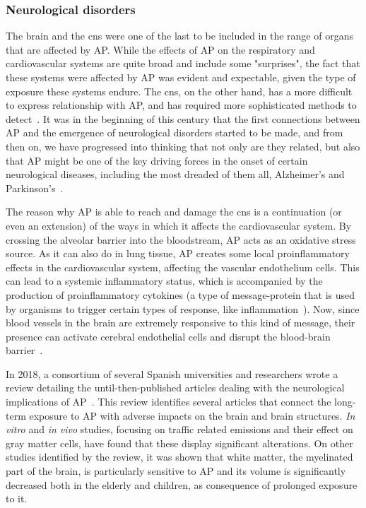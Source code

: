 \subsubsection{Neurological disorders}%
\label{ssub:neurological_disorders}

The brain and the \gls{cns} were one of the last to be included in the
range of organs that are affected by \gls{AP}. While the effects of
\gls{AP} on the respiratory and cardiovascular systems are quite broad
and include some "surprises", the fact that these systems were affected
by \acrlong{AP} was evident and expectable, given the type of exposure
these systems endure. The \gls{cns}, on the other hand, has a more
difficult to express relationship with \gls{AP}, and has required more
sophisticated methods to detect~\cite{Vallero2014, Genc2012}. It was in
the beginning of this century that the first connections between
\gls{AP} and the emergence of neurological disorders started to be made,
and from then on, we have progressed into thinking that not only are
they related, but also that \gls{AP} might be one of the key driving
forces in the onset of certain neurological diseases, including the most
dreaded of them all, Alzheimer's and Parkinson's~\cite{Genc2012,
DePradoBert2018, Calderon-Garciduenas2014}.

The reason why \gls{AP} is able to reach and damage the \gls{cns} is a
continuation (or even an extension) of the ways in which it affects the
cardiovascular system. By crossing the alveolar barrier into the
bloodstream, \gls{AP} acts as an oxidative stress source. As it can also
do in lung tissue, \acrlong{AP} creates some local proinflammatory
effects in the cardiovascular system, affecting the vascular endothelium
cells. This can lead to a systemic inflammatory status, which is
accompanied by the production of proinflammatory cytokines (a type of
message-protein that is used by organisms to trigger certain types of
response, like inflammation~\cite{Zhang2007}). Now, since blood vessels in the
brain are extremely responsive to this kind of message, their presence
can activate cerebral endothelial cells and disrupt the blood-brain
barrier~\cite{Genc2012}.

In 2018, a consortium of several Spanish universities and researchers
wrote a review detailing the until-then-published articles dealing with
the neurological implications of \gls{AP}~\cite{DePradoBert2018}. This
review identifies several articles that connect the long-term exposure
to \acrlong{AP} with adverse impacts on the brain and brain structures.
\emph{In vitro} and \emph{in vivo} studies,  focusing on traffic related
emissions and their effect on gray matter cells, have found that these
display significant alterations. On other studies identified by the
review, it was shown that white matter, the myelinated part of the
brain, is particularly sensitive to \gls{AP} and its volume is
significantly decreased both in the elderly and children, as consequence
of prolonged exposure to it. 

